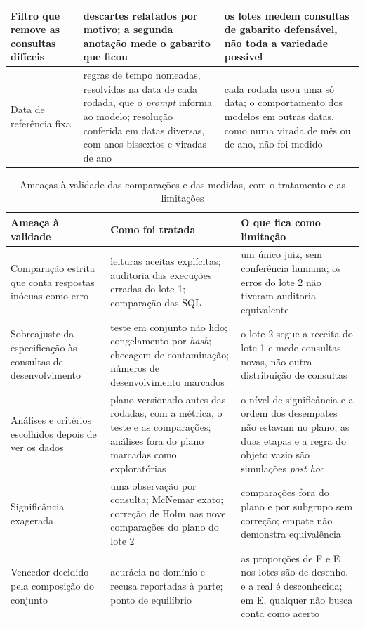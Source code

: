 \begin{table}[htbp!]
\begin{tabular}{|p{3.4cm}|p{5.9cm}|p{5.4cm}|}
Filtro que remove as consultas difíceis & descartes relatados por motivo; a segunda anotação mede o gabarito que ficou & os lotes medem consultas de gabarito defensável, não toda a variedade possível \\ \hline
Data de referência fixa & regras de tempo nomeadas, resolvidas na data de cada rodada, que o \textit{prompt} informa ao modelo; resolução conferida em datas diversas, com anos bissextos e viradas de ano & cada rodada usou uma só data; o comportamento dos modelos em outras datas, como numa virada de mês ou de ano, não foi medido \\ \hline
\end{tabular}
\end{table}

\begin{table}[htbp!]
\centering
\caption[Ameaças à validade das comparações e das medidas]{Ameaças à validade das comparações e das medidas, com o tratamento e as limitações}
\label{tab:ameacas-validade-comparacoes}
\footnotesize
\begin{tabular}{|p{3.4cm}|p{5.9cm}|p{5.4cm}|}
\hline
\textbf{Ameaça à validade} & \textbf{Como foi tratada} & \textbf{O que fica como limitação} \\
\hline
Comparação estrita que conta respostas inócuas como erro & leituras aceitas explícitas; auditoria das execuções erradas do lote 1; comparação das SQL & um único juiz, sem conferência humana; os erros do lote 2 não tiveram auditoria equivalente \\ \hline
Sobreajuste da especificação às consultas de desenvolvimento & teste em conjunto não lido; congelamento por \textit{hash}; checagem de contaminação; números de desenvolvimento marcados & o lote 2 segue a receita do lote 1 e mede consultas novas, não outra distribuição de consultas \\ \hline
Análises e critérios escolhidos depois de ver os dados & plano versionado antes das rodadas, com a métrica, o teste e as comparações; análises fora do plano marcadas como exploratórias & o nível de significância e a ordem dos desempates não estavam no plano; as duas etapas e a regra do objeto vazio são simulações \textit{post hoc} \\ \hline
Significância exagerada & uma observação por consulta; McNemar exato; correção de Holm nas nove comparações do plano do lote 2 & comparações fora do plano e por subgrupo sem correção; empate não demonstra equivalência \\ \hline
Vencedor decidido pela composição do conjunto & acurácia no domínio e recusa reportadas à parte; ponto de equilíbrio & as proporções de F e E nos lotes são de desenho, e a real é desconhecida; em E, qualquer não busca conta como acerto \\ \hline

\end{tabular}
\end{table}
